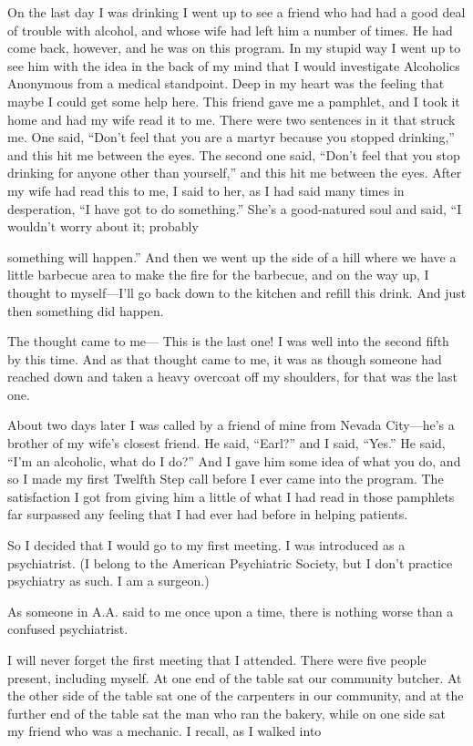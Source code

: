 On the last day I was drinking I went up to see a friend who had had a good deal of trouble with alcohol, and whose wife had left him a number of times. He had come back, however, and he was on this program. In my stupid way I went up to see him with the idea in the back of my mind that I would investigate Alcoholics Anonymous from a medical standpoint. Deep in my heart was the feeling that maybe I could get some help here. This friend gave me a pamphlet, and I took it home and had my wife read it to me. There were two sentences in it that struck me. One said, “Don’t feel that you are a martyr because you stopped drinking,” and this hit me between the eyes. The second one said, “Don’t feel that you stop drinking for anyone other than yourself,” and this hit me between the eyes. After my wife had read this to me, I said to her, as I had said many times in desperation, “I have got to do something.” She’s a good-natured soul and said, “I wouldn’t worry about it; probably

something will happen.” And then we went up the side of a hill where we have a little barbecue area to make the fire for the barbecue, and on the way up, I thought to myself—I’ll go back down to the kitchen and refill this drink. And just then something did happen.

The thought came to me— This is the last one! I was well into the second fifth by this time. And as that thought came to me, it was as though someone had reached down and taken a heavy overcoat off my shoulders, for that was the last one.

About two days later I was called by a friend of mine from Nevada City—he’s a brother of my wife’s closest friend. He said, “Earl?” and I said, “Yes.” He said, “I’m an alcoholic, what do I do?” And I gave him some idea of what you do, and so I made my first Twelfth Step call before I ever came into the program. The satisfaction I got from giving him a little of what I had read in those pamphlets far surpassed any feeling that I had ever had before in helping patients.

So I decided that I would go to my first meeting. I was introduced as a psychiatrist. (I belong to the American Psychiatric Society, but I don’t practice psychiatry as such. I am a surgeon.)

As someone in A.A. said to me once upon a time, there is nothing worse than a confused psychiatrist.

I will never forget the first meeting that I attended. There were five people present, including myself. At one end of the table sat our community butcher. At the other side of the table sat one of the carpenters in our community, and at the further end of the table sat the man who ran the bakery, while on one side sat my friend who was a mechanic. I recall, as I walked into

